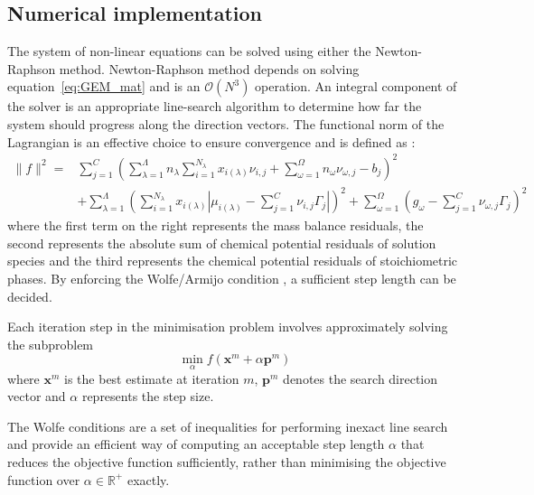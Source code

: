 	\subsection{Numerical implementation}
	The system of non-linear equations can be solved using either the Newton-Raphson method. Newton-Raphson method depends on solving  equation~\eqref{eq:GEM_mat} and is an $\mathcal{O}(N^3)$ operation.	
	An integral component of the solver is an appropriate line-search algorithm to determine how far the system should progress along the direction vectors. The functional norm of the Lagrangian is an effective choice to ensure convergence and is defined as \cite{Piro17}:
	\begin{equation}
	\begin{aligned}
		\|f\|^2 = &\sum_{j=1}^{C}\left(\sum_{\lambda=1}^{\Lambda} n_\lambda \sum_{i=1}^{N_\lambda} x_{i(\lambda)}\nu_{i,j} + \sum_{\omega=1}^{\Omega}n_{\omega}\nu_{\omega,j} - b_j\right)^2 \\
		&+ \sum_{\lambda=1}^{\Lambda} \left(\sum_{i=1}^{N_\lambda} x_{i(\lambda)}\left\vert\mu_{i(\lambda)} - \sum_{j=1}^{C}\nu_{i,j} \Gamma_j \right\vert \right)^2 + \sum_{\omega=1}^{\Omega}\left(g_\omega - \sum_{j=1}^{C}\nu_{\omega,j} \Gamma_j \right)^2
		\end{aligned}
	\end{equation}
	where the first term on the right represents the mass balance residuals, the second represents the absolute sum of chemical potential residuals of solution species and the third represents the chemical potential residuals of stoichiometric phases. By enforcing the Wolfe/Armijo condition \cite{Nocedal06}, a sufficient step length can be decided.
	
	Each iteration step in the minimisation problem involves approximately solving the subproblem 
	\begin{equation}
		\min_\alpha f\left(\mathbf{x}^m + \alpha \mathbf{p}^m\right)
	\end{equation}
	where $\mathbf{x}^m$ is the best estimate at iteration $m$, $\mathbf{p}^m$ denotes the search direction vector and $\alpha$ represents the step size. 
	
	The Wolfe conditions are a set of inequalities for performing inexact line search and provide an efficient way of computing an acceptable step length $\alpha$  that reduces the objective function sufficiently, rather than minimising the objective function over $\alpha \in \mathbb {R}^{+}$ exactly.
	
